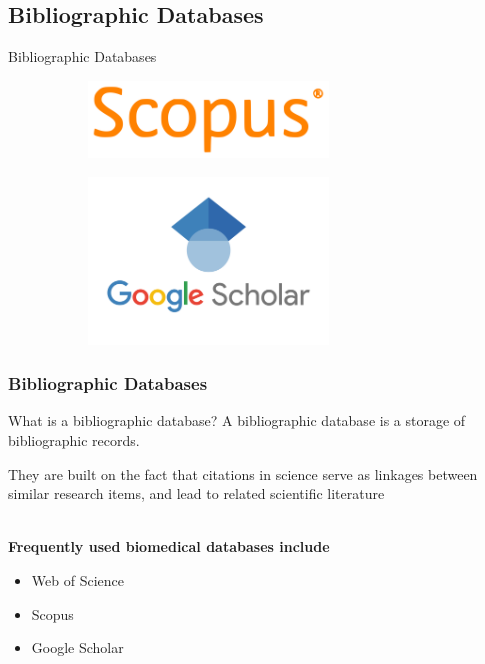 \documentclass{beamer}
\begin{document}
\subsection{Bibliographic Databases}
\begin{frame}
    \begin{center}
        {\huge Bibliographic Databases}
    \end{center}
    \begin{figure}[h]
        \begin{subfigure}{0.49\textwidth}
            \centering
            \includegraphics[width=0.7\textwidth]{s.png}
        \end{subfigure}
        \begin{subfigure}{0.49\textwidth}
            \centering
            \includegraphics[width=0.7\textwidth]{gs.png}
        \end{subfigure}
    \end{figure}
\end{frame}
\begin{frame}

    \frametitle{Bibliographic Databases}

    \begin{block}{What is a bibliographic database?}
       A bibliographic database is a storage of bibliographic records.
    \end{block}

    They are built on the fact that citations in science serve as linkages between similar research items, and lead to related scientific literature\\~\

    \textbf{Frequently used biomedical databases include}
    \begin{itemize}
        \item Web of Science
        \item Scopus
        \item Google Scholar
    \end{itemize}
\end{frame}
\end{document}

